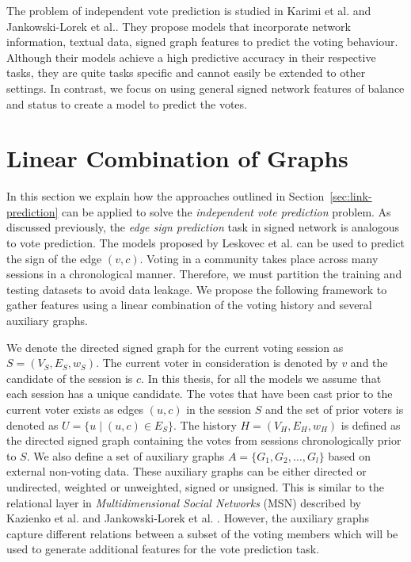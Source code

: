 The problem of independent vote prediction is studied in Karimi et al. \cite{karimi2019multicongress} and Jankowski-Lorek et al.\cite{jankowski-lorek2013MBSN}. They propose models that incorporate network information, textual data, signed graph features to predict the voting behaviour. Although their models achieve a high predictive accuracy in their respective tasks, they are quite tasks specific and cannot easily be extended to other settings. In contrast, we focus on using general signed network features of balance and status to create a model to predict the votes. 

\fi

\section{Linear Combination of Graphs}
\label{sec:linear-combination-theory}

In this section we explain how the approaches outlined in Section~\ref{sec:link-prediction} can be applied to solve the \textit{independent vote prediction} problem. As discussed previously, the \textit{edge sign prediction} task in signed network is analogous to vote prediction. The models proposed by Leskovec et al. \cite{leskovec2010predicting} can be used to predict the sign of the edge $(v,c)$. Voting in a community takes place across many sessions in a chronological manner. Therefore, we must partition the training and testing datasets to avoid data leakage. We propose the following framework to gather features using a linear combination of the voting history and several auxiliary graphs.

We denote the directed signed graph for the current voting session as $S=(V_S,E_S,w_S)$. The current voter in consideration is denoted by $v$ and the candidate of the session is $c$. In this thesis, for all the models we assume that each session has a unique candidate. The votes that have been cast prior to the current voter exists as edges $(u,c)$ in the session $S$ and the set of prior voters is denoted as $U =\{u \mid (u,c) \in E_S\}$. The history $H=(V_H,E_H,w_H)$ is defined as the directed signed graph containing the votes from sessions chronologically prior to $S$. We also define a set of auxiliary graphs $A = \{G_1,G_2,\dots,G_l\}$ based on external non-voting data. These auxiliary graphs can be either directed or undirected, weighted or unweighted, signed or unsigned. This is similar to the relational layer in \textit{Multidimensional Social Networks} (MSN) described by Kazienko et al. \cite{kazienko2011multidimensional} and Jankowski-Lorek et al. \cite{jankowski-lorek2013MBSN}. However, the auxiliary graphs capture different relations between a subset of the voting members which will be used to generate additional features for the vote prediction task. 

